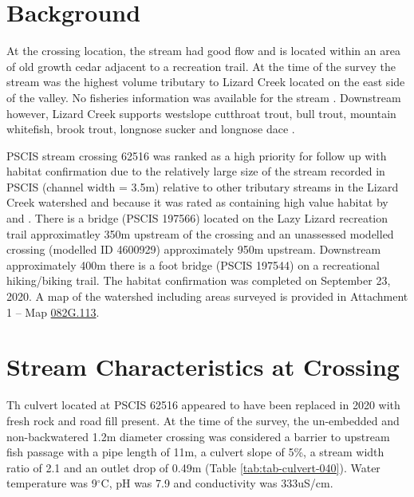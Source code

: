 \documentclass[
]{book}
\begin{document}
\hypertarget{background-6}{%
\section*{Background}\label{background-6}}

At the crossing location, the stream had good flow and is located within an area of old growth cedar adjacent to a recreation trail. At the time of the survey the stream was the highest volume tributary to Lizard Creek located on the east side of the valley. No fisheries information was available for the stream \citep{moeStreamInventorySample}. Downstream however, Lizard Creek supports westslope cutthroat trout, bull trout, mountain whitefish, brook trout, longnose sucker and longnose dace \citep{data_fish_obs}.

PSCIS stream crossing 62516 was ranked as a high priority for follow up with habitat confirmation due to the relatively large size of the stream recorded in PSCIS (channel width = 3.5m) relative to other tributary streams in the Lizard Creek watershed and because it was rated as containing high value habitat by \citet{vastFishPassage2013} and \citet{grainger2011FishPassage2011}. There is a bridge (PSCIS 197566) located on the Lazy Lizard recreation trail approximatley 350m upstream of the crossing and an unassessed modelled crossing (modelled ID 4600929) approximately 950m upstream. Downstream approximately 400m there is a foot bridge (PSCIS 197544) on a recreational hiking/biking trail. The habitat confirmation was completed on September 23, 2020. A map of the watershed including areas surveyed is provided in Attachment 1 -- Map \href{https://hillcrestgeo.ca/outgoing/fishpassage/projects/elk/FishPassage_082G.113.pdf}{082G.113}.

\hypertarget{stream-characteristics-at-crossing-5}{%
\section*{Stream Characteristics at Crossing}\label{stream-characteristics-at-crossing-5}}

Th culvert located at PSCIS 62516 appeared to have been replaced in 2020 with fresh rock and road fill present. At the time of the survey, the un-embedded and non-backwatered 1.2m diameter crossing was considered a barrier to upstream fish passage with a pipe length of 11m, a culvert slope of 5\%, a stream width ratio of 2.1 and an outlet drop of 0.49m (Table \ref{tab:tab-culvert-040}). Water temperature was 9\(^\circ\)C, pH was 7.9 and conductivity was 333uS/cm.
\end{document}
